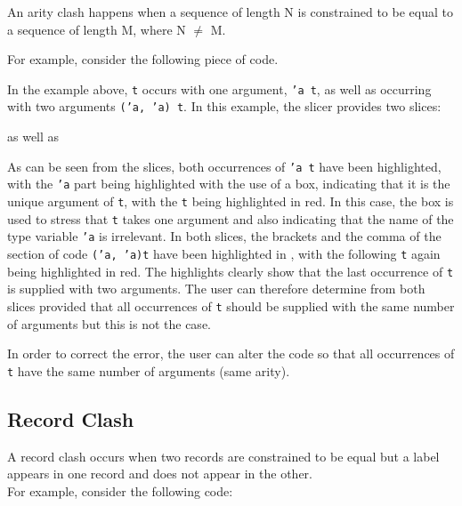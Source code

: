 \documentclass{report}
\begin{document}
\begin{itemize}
  \subitem An arity clash happens when a sequence of length N is
  constrained to be equal to a sequence of length M, where N $\neq$ M.

For example, consider the following piece of code.


In the example above, \texttt{t} occurs with one argument,
\texttt{'a t}, as well as occurring with two arguments
\texttt{('a, 'a) t}. In this example, the slicer provides two
slices:


as well as


As can be seen from the slices, both occurrences of \texttt{'a
  t} have been highlighted, with the \texttt{'a} part being
highlighted with the use of a box, indicating that it is the unique
argument of \texttt{t}, with the \texttt{t} being
highlighted in red. In this case, the box is used to stress that
\texttt{t} takes one argument and also indicating that the name
of the type variable \texttt{'a} is irrelevant. In both slices,
the brackets and the comma of the section of code \texttt{('a,
  'a)t} have been highlighted in \tesEndPointOne, with the following
\texttt{t} again being highlighted in red. The \tesEndPointOne highlights
clearly show that the last occurrence of \texttt{t} is supplied
with two arguments. The user can therefore determine from both slices
provided that all occurrences of \texttt{t} should be supplied
with the same number of arguments but this is not the case.

In order to correct the error, the user can alter the code so that all
occurrences of \texttt{t} have the same number of arguments
(same arity).

\newpage


\subsection {Record Clash}

\subitem A record clash occurs when two records are constrained to be
equal but a label appears in one record and does not appear in the other.
\\
For example, consider the following code:


\end{itemize}
\end{document}
